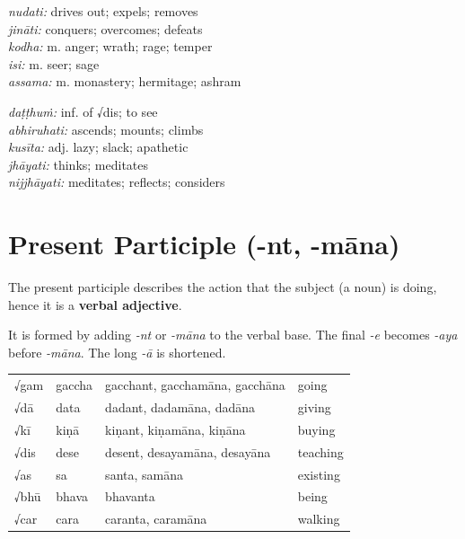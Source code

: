 \documentclass[11pt,oneside]{memoir}
\begin{document}
\normalArrayStretch

\bigskip

\begin{twocols}
\emph{nudati:} drives out; expels; removes\\
\emph{jināti:} conquers; overcomes; defeats\\
\emph{kodha:} m. anger; wrath; rage; temper\\
\emph{isi:} m. seer; sage\\
\emph{assama:} m.  monastery; hermitage; ashram\\

\columnbreak

\emph{daṭṭhuṁ:} inf. of √dis; to see\\
\emph{abhiruhati:} ascends; mounts; climbs\\
\emph{kusīta:} adj. lazy; slack; apathetic\\
\emph{jhāyati:} thinks; meditates\\
\emph{nijjhāyati:} meditates; reflects; considers
\end{twocols}

\clearpage
\section{Present Participle (-nt, -māna)}
\label{sec:org006f540}

The present participle describes the action that the subject (a noun) is doing, hence it is a \textbf{verbal adjective}.

It is formed by adding \emph{-nt} or \emph{-māna} to the verbal base.
The final \emph{-e} becomes \emph{-aya} before \emph{-māna}. The long \emph{-ā} is shortened.

\begin{center}
\begin{tabular}{llll}
√gam & gaccha & gacchant, gacchamāna, gacchāna & going\\
√dā & data & dadant, dadamāna, dadāna & giving\\
√kī & kiṇā & kiṇant, kiṇamāna, kiṇāna & buying\\
√dis & dese & desent, desayamāna, desayāna & teaching\\
√as & sa & santa, samāna & existing\\
√bhū & bhava & bhavanta & being\\
√car & cara & caranta, caramāna & walking\\
\end{tabular}
\end{center}
\end{document}
